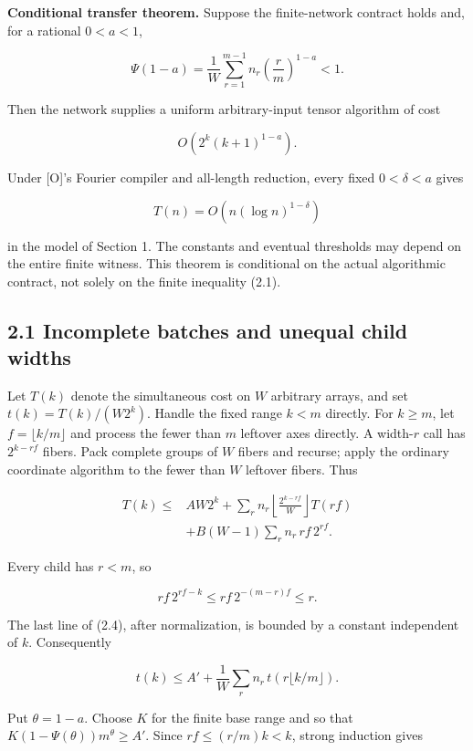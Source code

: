 \documentclass[
  11pt,
]{article}
\begin{document}
\textbf{Conditional transfer theorem.} Suppose the finite-network
contract holds and, for a rational \(0<a<1\),

\[
\Psi(1-a)=\frac1W\sum_{r=1}^{m-1} n_r\left(\frac rm\right)^{1-a}<1.
\tag{2.1}
\]

Then the network supplies a uniform arbitrary-input tensor algorithm of
cost

\[
O\!\left(2^k(k+1)^{1-a}\right).
\tag{2.2}
\]

Under {[}O{]}'s Fourier compiler and all-length reduction, every fixed
\(0<\delta<a\) gives

\[
T(n)=O\!\left(n(\log n)^{1-\delta}\right)
\tag{2.3}
\]

in the model of Section 1. The constants and eventual thresholds may
depend on the entire finite witness. This theorem is conditional on the
actual algorithmic contract, not solely on the finite inequality (2.1).

\subsection{2.1 Incomplete batches and unequal child
widths}\label{incomplete-batches-and-unequal-child-widths}

Let \(T(k)\) denote the simultaneous cost on \(W\) arbitrary arrays, and
set \(t(k)=T(k)/(W2^k)\). Handle the fixed range \(k<m\) directly. For
\(k\ge m\), let \(f=\lfloor k/m\rfloor\) and process the fewer than
\(m\) leftover axes directly. A width-\(r\) call has \(2^{k-rf}\)
fibers. Pack complete groups of \(W\) fibers and recurse; apply the
ordinary coordinate algorithm to the fewer than \(W\) leftover fibers.
Thus

\[
\begin{split}
T(k)\le{}& A W2^k+
\sum_r n_r\left\lfloor\frac{2^{k-rf}}W\right\rfloor T(rf)\\
&+B(W-1)\sum_r n_r\,rf\,2^{rf}.
\end{split}
\tag{2.4}
\]

Every child has \(r<m\), so

\[
rf\,2^{rf-k}\le rf\,2^{-(m-r)f}\le r.
\]

The last line of (2.4), after normalization, is bounded by a constant
independent of \(k\). Consequently

\[
t(k)\le A'+\frac1W\sum_r n_r\,t(r\lfloor k/m\rfloor).
\tag{2.5}
\]

Put \(\theta=1-a\). Choose \(K\) for the finite base range and so that
\(K(1-\Psi(\theta))m^\theta\ge A'\). Since \(rf\le(r/m)k<k\), strong
induction gives
\end{document}
